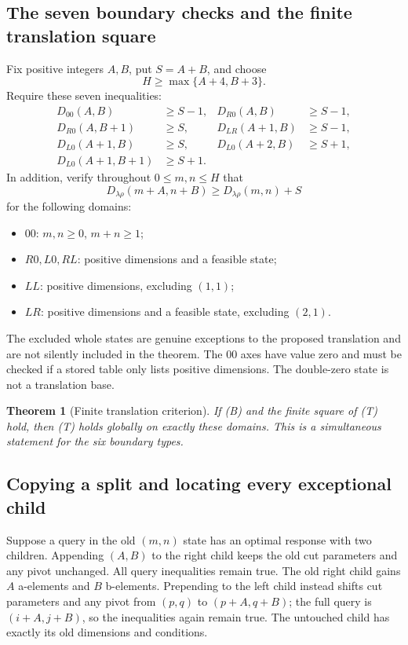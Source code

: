 \documentclass[11pt]{article}
\newtheorem{theorem}{Theorem}[section]
\theoremstyle{definition}
\theoremstyle{remark}
\begin{document}
\subsection{The seven boundary checks and the finite translation square}
Fix positive integers $A,B$, put $S=A+B$, and choose
\[
 H\ge\max\{A+4,B+3\}.
\]
Require these seven inequalities:
\begin{align*}
 D_{00}(A,B)&\ge S-1,& D_{R0}(A,B)&\ge S-1,\\
 D_{R0}(A,B+1)&\ge S,& D_{LR}(A+1,B)&\ge S-1,\\
 D_{L0}(A+1,B)&\ge S,& D_{L0}(A+2,B)&\ge S+1,\\
 D_{L0}(A+1,B+1)&\ge S+1.&&
 \tag{B}
\end{align*}
In addition, verify throughout $0\le m,n\le H$ that
\begin{equation}
 D_{\lambda\rho}(m+A,n+B)\ge D_{\lambda\rho}(m,n)+S
 \tag{T}
\end{equation}
for the following domains:
\begin{itemize}
\item $00$: $m,n\ge0$, $m+n\ge1$;
\item $R0,L0,RL$: positive dimensions and a feasible state;
\item $LL$: positive dimensions, excluding $(1,1)$;
\item $LR$: positive dimensions and a feasible state, excluding $(2,1)$.
\end{itemize}
The excluded whole states are genuine exceptions to the proposed
translation and are not silently included in the theorem.
The $00$ axes have value zero and must be checked if a stored table only
lists positive dimensions. The double-zero state is not a translation base.

\begin{theorem}[Finite translation criterion]
\label{thm:translation}
If (B) and the finite square of (T) hold, then (T) holds globally on exactly
these domains. This is a simultaneous statement for the six boundary types.
\end{theorem}

\subsection{Copying a split and locating every exceptional child}
Suppose a query in the old $(m,n)$ state has an optimal response with two
children. Appending $(A,B)$ to the right child keeps the old cut parameters
and any pivot unchanged. All query inequalities remain true. The old right
child gains $A$ a-elements and $B$ b-elements. Prepending to the left child
instead shifts cut parameters and any pivot from $(p,q)$ to $(p+A,q+B)$;
the full query is $(i+A,j+B)$, so the inequalities again remain true.
The untouched child has exactly its old dimensions and conditions.
\end{document}
